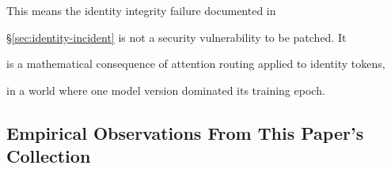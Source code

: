 This means the identity integrity failure documented in





\S\ref{sec:identity-incident} is not a security vulnerability to be patched. It





is a mathematical consequence of attention routing applied to identity tokens,





in a world where one model version dominated its training epoch.











\subsection{Empirical Observations From This Paper's Collection}











